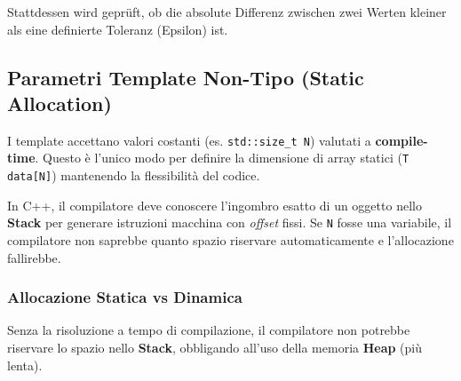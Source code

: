 Stattdessen wird geprüft, ob die absolute Differenz zwischen zwei Werten kleiner als eine definierte Toleranz 
(Epsilon) ist.



\subsection{Parametri Template Non-Tipo (Static Allocation)}

I template accettano valori costanti (es. \texttt{std::size\_t N}) valutati a 
\textbf{compile-time}. Questo è l'unico modo per definire la dimensione di array statici 
(\texttt{T data[N]}) mantenendo la flessibilità del codice.

In C++, il compilatore deve conoscere l'ingombro esatto di un oggetto nello \textbf{Stack}
per generare istruzioni macchina con \textit{offset} fissi. Se \texttt{N} fosse una
variabile, il compilatore non saprebbe quanto spazio riservare automaticamente e 
l'allocazione fallirebbe.

\subsubsection{Allocazione Statica vs Dinamica}
Senza la risoluzione a tempo di compilazione, il compilatore non potrebbe riservare lo spazio nello \textbf{Stack}, obbligando all'uso della memoria \textbf{Heap} (più lenta).

\vspace{1em}



